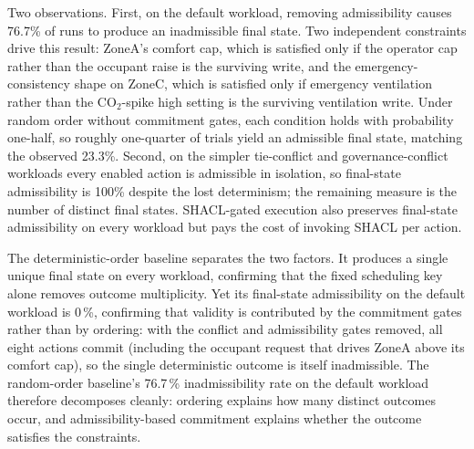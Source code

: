 \documentclass{ieeeaccess}
\theoremstyle{definition}
\theoremstyle{plain}
\theoremstyle{remark}
\begin{document}
Two observations. First, on the default workload, removing admissibility causes 76.7\% of runs to produce an inadmissible final state. Two independent constraints drive this result: ZoneA's comfort cap, which is satisfied only if the operator cap rather than the occupant raise is the surviving write, and the emergency-consistency shape on ZoneC, which is satisfied only if emergency ventilation rather than the CO$_2$-spike high setting is the surviving ventilation write. Under random order without commitment gates, each condition holds with probability one-half, so roughly one-quarter of trials yield an admissible final state, matching the observed 23.3\%. Second, on the simpler tie-conflict and governance-conflict workloads every enabled action is admissible in isolation, so final-state admissibility is 100\% despite the lost determinism; the remaining measure is the number of distinct final states. SHACL-gated execution also preserves final-state admissibility on every workload but pays the cost of invoking SHACL per action.

The deterministic-order baseline separates the two factors. It produces a single unique final state on every workload, confirming that the fixed scheduling key alone removes outcome multiplicity. Yet its final-state admissibility on the default workload is 0\,\%, confirming that validity is contributed by the commitment gates rather than by ordering: with the conflict and admissibility gates removed, all eight actions commit (including the occupant request that drives ZoneA above its comfort cap), so the single deterministic outcome is itself inadmissible. The random-order baseline's 76.7\,\% inadmissibility rate on the default workload therefore decomposes cleanly: ordering explains how many distinct outcomes occur, and admissibility-based commitment explains whether the outcome satisfies the constraints.
\end{document}
